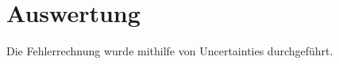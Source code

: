 \section{Auswertung}
\label{sec:Auswertung}

Die Fehlerrechnung wurde mithilfe von Uncertainties \cite{uncertainties} durchgeführt.
